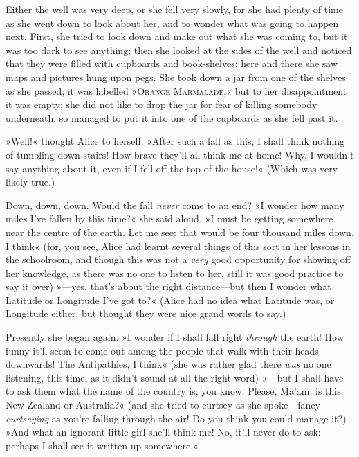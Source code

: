 \begin{placeholder}
Either the well was very deep, or she fell very slowly, for she had plenty of time as she went down to look about her, and to wonder what was going to happen next. First, she tried to look down and make out what she was coming to, but it was too dark to see anything; then she looked at the sides of the well and noticed that they were filled with cupboards and book-shelves: here and there she saw maps and pictures hung upon pegs. She took down a jar from one of the shelves as she passed; it was labelled »\textsc{Orange Marmalade},« but to her disappointment it was empty; she did not like to drop the jar for fear of killing somebody underneath, so managed to put it into one of the cupboards as she fell past it.

»Well!« thought Alice to herself. »After such a fall as this, I shall think nothing of tumbling down stairs! How brave they'll all think me at home! Why, I wouldn't say anything about it, even if I fell off the top of the house!« (Which was very likely true.)
\clearpage
\end{placeholder}

Down, down, down. Would the fall \textit{never} come to an end? »I wonder how many miles I've fallen by this time?« she said aloud. »I must be getting somewhere near the centre of the earth. Let me see: that would be four thousand miles down. I think\longdash« (for, you see, Alice had learnt several things of this sort in her lessons in the schoolroom, and though this was not a \textit{very} good opportunity for showing off her knowledge, as there was no one to listen to her, still it was good practice to say it over) »—yes, that's about the right distance—but then I wonder what Latitude or Longitude I've got to?« (Alice had no idea what Latitude was, or Longitude either, but thought they were nice grand words to say.)

Presently she began again. »I wonder if I shall fall right \textit{through} the earth! How funny it'll seem to come out among the people that walk with their heads downwards! The Antipathies, I think\longdash« (she was rather glad there \textit{was} no one listening, this time, as it didn't sound at all the right word) »—but I shall have to ask them what the name of the country is, you know. Please, Ma'am, is this New Zealand or Australia?« (and she tried to curtsey as she spoke—fancy \textit{curtseying} as you're falling through the air! Do you think you could manage it?) »And what an ignorant little girl she'll think me! No, it'll never do to ask: perhaps I shall see it written up somewhere.«



